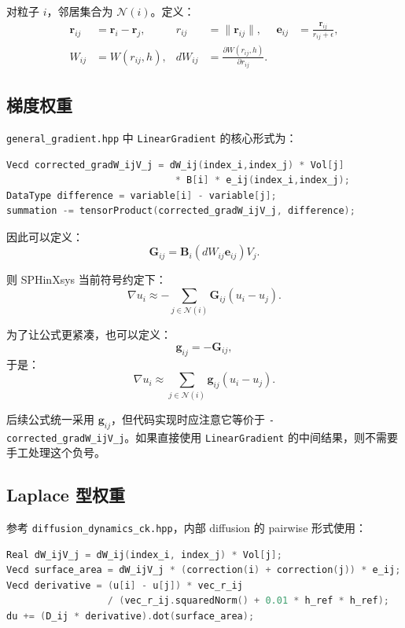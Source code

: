 \documentclass[UTF8,a4paper,11pt]{ctexart}
\newcommand{\code}[1]{\texttt{#1}}
\newcommand{\Nset}{\mathcal N}
\begin{document}
对粒子 $i$，邻居集合为 $\Nset(i)$。定义：
\begin{align}
\bm r_{ij}&=\bm r_i-\bm r_j, &
 r_{ij}&=\|\bm r_{ij}\|, &
\bm e_{ij}&=\frac{\bm r_{ij}}{r_{ij}+\epsilon},\\
W_{ij}&=W(r_{ij},h), &
 dW_{ij}&=\frac{\partial W(r_{ij},h)}{\partial r_{ij}}.
\end{align}

\subsection{梯度权重}

\code{general\_gradient.hpp} 中 \code{LinearGradient} 的核心形式为：
\begin{lstlisting}[language=C++]
Vecd corrected_gradW_ijV_j = dW_ij(index_i,index_j) * Vol[j]
                              * B[i] * e_ij(index_i,index_j);
DataType difference = variable[i] - variable[j];
summation -= tensorProduct(corrected_gradW_ijV_j, difference);
\end{lstlisting}

因此可以定义：
\begin{equation}
\bm G_{ij}=\bm B_i\left(dW_{ij}\bm e_{ij}\right)V_j.
\end{equation}

则 SPHinXsys 当前符号约定下：
\begin{equation}
\nabla u_i \approx -\sum_{j\in\Nset(i)}\bm G_{ij}(u_i-u_j).
\end{equation}

为了让公式更紧凑，也可以定义：
\begin{equation}
\bm g_{ij}=-\bm G_{ij},
\end{equation}
于是：
\begin{equation}
\nabla u_i \approx \sum_{j\in\Nset(i)}\bm g_{ij}(u_i-u_j).
\end{equation}

后续公式统一采用 $\bm g_{ij}$，但代码实现时应注意它等价于 \code{-corrected\_gradW\_ijV\_j}。如果直接使用 \code{LinearGradient} 的中间结果，则不需要手工处理这个负号。

\subsection{Laplace 型权重}

参考 \code{diffusion\_dynamics\_ck.hpp}，内部 diffusion 的 pairwise 形式使用：
\begin{lstlisting}[language=C++]
Real dW_ijV_j = dW_ij(index_i, index_j) * Vol[j];
Vecd surface_area = dW_ijV_j * (correction(i) + correction(j)) * e_ij;
Vecd derivative = (u[i] - u[j]) * vec_r_ij
                  / (vec_r_ij.squaredNorm() + 0.01 * h_ref * h_ref);
du += (D_ij * derivative).dot(surface_area);
\end{lstlisting}
\end{document}
